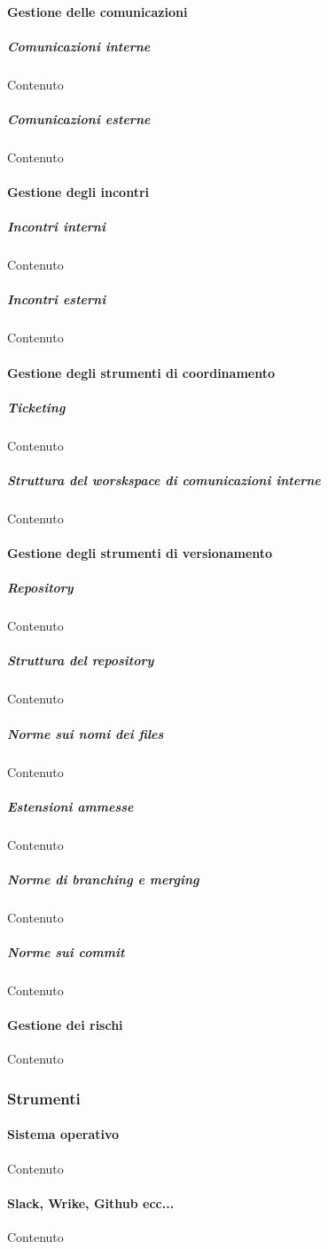     \paragraph{Gestione delle comunicazioni}

    \subparagraph{Comunicazioni interne}
    Contenuto

    \subparagraph{Comunicazioni esterne}
    Contenuto


    \paragraph{Gestione degli incontri}

    \subparagraph{Incontri interni}
    Contenuto

    \subparagraph{Incontri esterni}
    Contenuto


    \paragraph{Gestione degli strumenti di coordinamento}

    \subparagraph{Ticketing}
    Contenuto

    \subparagraph{Struttura del worskspace di comunicazioni interne}
    Contenuto


    \paragraph{Gestione degli strumenti di versionamento}

    \subparagraph{Repository}
    Contenuto

    \subparagraph{Struttura del repository}
    Contenuto

    \subparagraph{Norme sui nomi dei files}
    Contenuto

    \subparagraph{Estensioni ammesse}
    Contenuto

    \subparagraph{Norme di branching e merging}
    Contenuto

    \subparagraph{Norme sui commit}
    Contenuto


    \paragraph{Gestione dei rischi}
    Contenuto


    \subsubsection{Strumenti}

    \paragraph{Sistema operativo}
    Contenuto

    \paragraph{Slack, Wrike, Github ecc...}
    Contenuto

